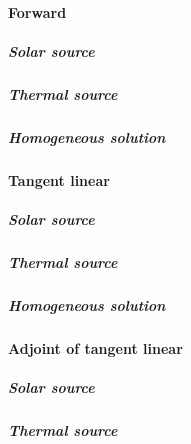 \paragraph{Forward}
\label{sec:source_function_integration-local_source_classical-downward-forward}

\subparagraph{Solar source}
\label{sec:source_function_integration-local_source_classical-downward-forward-solar_source}

\subparagraph{Thermal source}
\label{sec:source_function_integration-local_source_classical-downward-forward-thermal_source}

\subparagraph{Homogeneous solution}
\label{sec:source_function_integration-local_source_classical-downward-forward-homogeneous_solution}


%
\paragraph{Tangent linear}
\label{sec:source_function_integration-local_source_classical-downward-tangent_linear}

\subparagraph{Solar source}
\label{sec:source_function_integration-local_source_classical-downward-tanget_linear-solar_source}

\subparagraph{Thermal source}
\label{sec:source_function_integration-local_source_classical-downward-tanget_linear-thermal_source}

\subparagraph{Homogeneous solution}
\label{sec:source_function_integration-local_source_classical-downward-tanget_linear-homogeneous_solution}



%
\paragraph{Adjoint of tangent linear}
\label{sec:source_function_integration-local_source_classical-downward-adjoint_of_tangent_linear}

\subparagraph{Solar source}
\label{sec:source_function_integration-local_source_classical-downward-adjoint_of_tanget_linear-solar_source}

\subparagraph{Thermal source}
\label{sec:source_function_integration-local_source_classical-downward-adjoint_of_tanget_linear-thermal_source}

